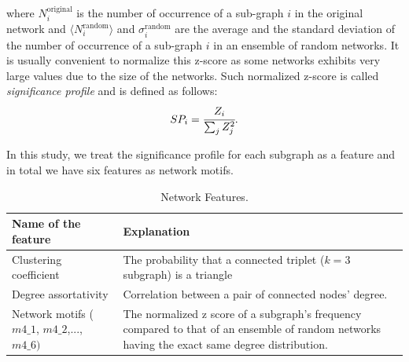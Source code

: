where $N_i^{\text{original}}$ is the number of occurrence of a sub-graph $i$ in the original network and $ \langle N_i^{\text{random}} \rangle$ and $\sigma_i^{\text{random}}$ are the average and the standard deviation of the number of occurrence of a sub-graph $i$ in an ensemble of random networks. It is usually convenient to normalize this z-score as some networks exhibits very large values due to the size of the networks. Such normalized z-score is called \textit{significance profile} and is defined as follows:
	\begin{equation}
	SP_i = \cfrac{Z_i}{\sum_j Z_j^2}.
	\end{equation}
	
In this study, we treat the significance profile for each subgraph as a feature and in total we have six features as network motifs.
\newline


\begin{table}[htb]
  \begin{center}
    \caption{Network Features.}
    \begin{tabular}{| l | p{8cm} |} \hline
      Name of the feature & Explanation  \\ \hline \hline
      Clustering coefficient &  The probability that a connected triplet ($k=3$ subgraph) is a triangle \\  %
      Degree assortativity &  Correlation between a pair of connected nodes' degree. \\  %
      Network motifs ($m4\_1$, $m4\_2$,..., $m4\_6)$& The normalized z score of a subgraph's frequency compared to that of an ensemble of random networks having the exact same degree distribution. \\ \hline
    \end{tabular}
    \label{tab:feature}
  \end{center}
\end{table}
